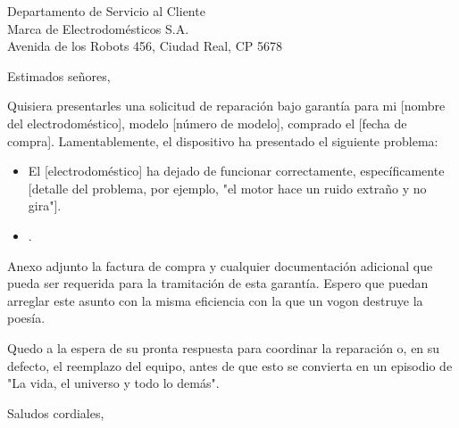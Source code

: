 \documentclass[stdletter]{newlfm}
\begin{document}
\begin{newlfm}{Departamento de Servicio al Cliente\\Marca de Electrodomésticos S.A.\\Avenida de los Robots 456, Ciudad Real, CP 5678}

\opening{Estimados señores,}

Quisiera presentarles una solicitud de reparación bajo garantía para mi [nombre del electrodoméstico], modelo [número de modelo], comprado el [fecha de compra]. Lamentablemente, el dispositivo ha presentado el siguiente problema:

\begin{itemize}
\item [Problema:] El [electrodoméstico] ha dejado de funcionar correctamente, específicamente [detalle del problema, por ejemplo, "el motor hace un ruido extraño y no gira"].
\item [Fecha de aparición:] [Fecha en que notaste el problema].
\end{itemize}

Anexo adjunto la factura de compra y cualquier documentación adicional que pueda ser requerida para la tramitación de esta garantía. Espero que puedan arreglar este asunto con la misma eficiencia con la que un vogon destruye la poesía.

Quedo a la espera de su pronta respuesta para coordinar la reparación o, en su defecto, el reemplazo del equipo, antes de que esto se convierta en un episodio de "La vida, el universo y todo lo demás".

\closing{Saludos cordiales,}

\end{newlfm}
\end{document}
